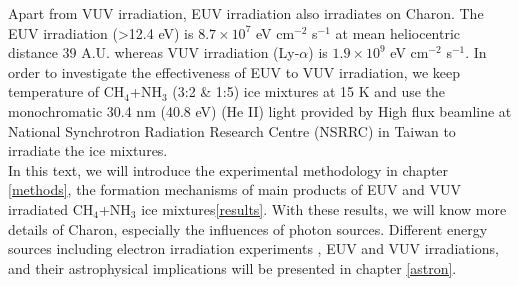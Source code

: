 Apart from VUV irradiation, EUV irradiation also irradiates on Charon. The EUV irradiation (>12.4 eV) is $8.7 \times 10^7$ eV cm$^{-2}$ s$^{-1}$ at mean heliocentric distance 39 A.U. whereas VUV irradiation (Ly-$\alpha$) is $1.9 \times 10^9$ eV cm$^{-2}$ s$^{-1}$\cite{grundy2016formation}. In order to investigate the effectiveness of EUV to VUV irradiation, we keep temperature of CH$_4$+NH$_3$ (3:2 \& 1:5) ice mixtures at 15 K and use the monochromatic 30.4 nm (40.8 eV) (He II) light provided by High flux beamline at National Synchrotron Radiation Research Centre (NSRRC) in Taiwan to irradiate the ice mixtures.\\

In this text, we will introduce the experimental methodology in chapter \ref{methods}, the formation mechanisms of main products of  EUV and VUV irradiated CH$_4$+NH$_3$ ice mixtures\ref{results}. With these results, we will know more details of Charon, especially the influences of photon sources. Different energy sources including electron irradiation experiments , EUV and VUV irradiations, and their astrophysical implications will be presented in chapter \ref{astron}.\\
